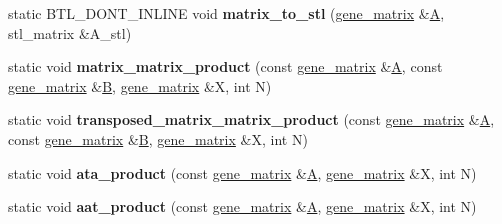 \begin{DoxyCompactItemize}
\item 
\mbox{\label{classeigen2__interface_a94ffec856e3bad5682bc1dba38ae5183}} 
static B\+T\+L\+\_\+\+D\+O\+N\+T\+\_\+\+I\+N\+L\+I\+NE void {\bfseries matrix\+\_\+to\+\_\+stl} (\hyperlink{group___core___module_class_eigen_1_1_matrix}{gene\+\_\+matrix} \&\hyperlink{group___core___module_class_eigen_1_1_matrix}{A}, stl\+\_\+matrix \&A\+\_\+stl)
\item 
\mbox{\label{classeigen2__interface_ab4cdbd35266bbb43e9f5695630e8b2fc}} 
static void {\bfseries matrix\+\_\+matrix\+\_\+product} (const \hyperlink{group___core___module_class_eigen_1_1_matrix}{gene\+\_\+matrix} \&\hyperlink{group___core___module_class_eigen_1_1_matrix}{A}, const \hyperlink{group___core___module_class_eigen_1_1_matrix}{gene\+\_\+matrix} \&\hyperlink{group___core___module_class_eigen_1_1_matrix}{B}, \hyperlink{group___core___module_class_eigen_1_1_matrix}{gene\+\_\+matrix} \&X, int N)
\item 
\mbox{\label{classeigen2__interface_a3104c3904177a876282c3b43a846d475}} 
static void {\bfseries transposed\+\_\+matrix\+\_\+matrix\+\_\+product} (const \hyperlink{group___core___module_class_eigen_1_1_matrix}{gene\+\_\+matrix} \&\hyperlink{group___core___module_class_eigen_1_1_matrix}{A}, const \hyperlink{group___core___module_class_eigen_1_1_matrix}{gene\+\_\+matrix} \&\hyperlink{group___core___module_class_eigen_1_1_matrix}{B}, \hyperlink{group___core___module_class_eigen_1_1_matrix}{gene\+\_\+matrix} \&X, int N)
\item 
\mbox{\label{classeigen2__interface_a7f31e6041dc5a6a89ca8c48eae2709c3}} 
static void {\bfseries ata\+\_\+product} (const \hyperlink{group___core___module_class_eigen_1_1_matrix}{gene\+\_\+matrix} \&\hyperlink{group___core___module_class_eigen_1_1_matrix}{A}, \hyperlink{group___core___module_class_eigen_1_1_matrix}{gene\+\_\+matrix} \&X, int N)
\item 
\mbox{\label{classeigen2__interface_a600b16095d8a06c8d742aa7a1e434ffc}} 
static void {\bfseries aat\+\_\+product} (const \hyperlink{group___core___module_class_eigen_1_1_matrix}{gene\+\_\+matrix} \&\hyperlink{group___core___module_class_eigen_1_1_matrix}{A}, \hyperlink{group___core___module_class_eigen_1_1_matrix}{gene\+\_\+matrix} \&X, int N)

\end{DoxyCompactItemize}
